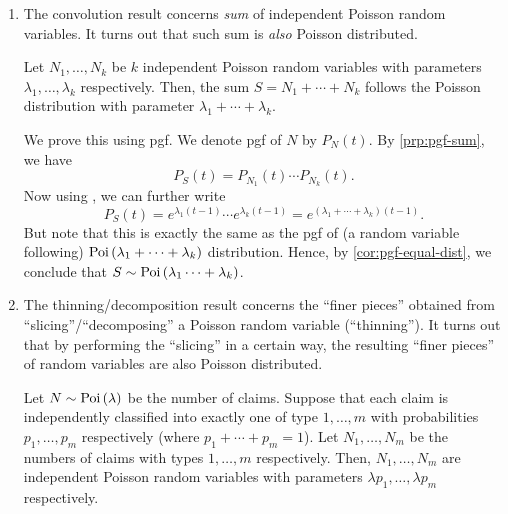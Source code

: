\begin{enumerate}
\item The convolution result concerns \emph{sum} of independent Poisson random
variables. It turns out that such sum is \emph{also} Poisson distributed.
\begin{theorem}
\label{thm:pois-convolution}
Let \(N_1,\dotsc,N_k\) be \(k\) independent Poisson random variables with
parameters \(\lambda_1,\dotsc,\lambda_k\) respectively. Then, the sum
\(S=N_1+\dotsb+N_k\) follows the Poisson distribution with parameter
\(\lambda_1+\dotsb+\lambda_k\).
\end{theorem}
\begin{pf}
We prove this using pgf. We denote pgf of \(N\) by \(P_N(t)\).  By
\cref{prp:pgf-sum}, we have
\[
P_S(t)=P_{N_1}(t)\dotsb P_{N_k}(t).
\]
Now using , we can further write
\[
P_S(t)=e^{\lambda_1(t-1)}\dotsb e^{\lambda_k(t-1)}
=e^{(\lambda_1+\dotsb+\lambda_k)(t-1)}.
\]
But note that this is exactly the same as the pgf of (a random variable
following) \(\operatorname{Poi}\left(\lambda_1+\dotsb+\lambda_k\right)\) distribution. Hence, by
\cref{cor:pgf-equal-dist}, we conclude that
\(S\sim\operatorname{Poi}\left(\lambda_1\dotsb+\lambda_k\right)\).
\end{pf}
\item The thinning/decomposition result concerns the ``finer pieces'' obtained
from ``slicing''/``decomposing'' a Poisson random variable (``thinning'').  It
turns out that by performing the ``slicing'' in a certain way, the resulting
``finer pieces'' of random variables are also Poisson distributed.

\begin{theorem}
\label{thm:pois-thinning}
Let \(N\sim\operatorname{Poi}\left(\lambda\right)\) be the number of claims. Suppose that each claim is
independently classified into exactly one of type \(1,\dotsc,m\) with
probabilities \(p_1,\dotsc,p_m\) respectively (where \(p_1+\dotsb+p_m=1\)). Let
\(N_1,\dotsc,N_m\) be the numbers of claims with types \(1,\dotsc,m\)
respectively. Then, \(N_1,\dotsc,N_m\) are independent Poisson random variables
with parameters \(\lambda p_1,\dotsc,\lambda p_m\) respectively.
\end{theorem}
\begin{center}
\end{center}
\end{enumerate}
